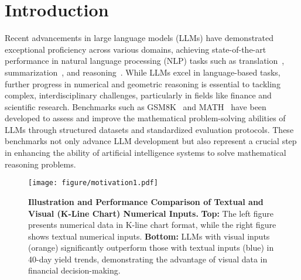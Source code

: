 \section{Introduction}



Recent advancements in large language models (LLMs) have demonstrated exceptional proficiency across various domains, achieving state-of-the-art performance in natural language processing (NLP) tasks such as translation~\citep{TransLLaMa}, summarization~\citep{exploregptquery}, and reasoning~\citep{LLM-ARC, reasoning}. While LLMs excel in language-based tasks, further progress in numerical and geometric reasoning is essential to tackling complex, interdisciplinary challenges, particularly in fields like finance and scientific research. Benchmarks such as \textsc{GSM8K}~\citep{cobbe2021gsm8k} and \textsc{MATH}~\citep{MATH} have been developed to assess and improve the mathematical problem-solving abilities of LLMs through structured datasets and standardized evaluation protocols. These benchmarks not only advance LLM development but also represent a crucial step in enhancing the ability of artificial intelligence systems to solve mathematical reasoning problems.
 
\begin{figure}
	\centering
	\texttt{[image: figure/motivation1.pdf]}
	\caption{\textbf{Illustration and Performance Comparison of Textual and Visual (K-Line Chart) Numerical Inputs.} 
	\textbf{Top:} The left figure presents numerical data in K-line chart format, while the right figure shows textual numerical inputs. 
	\textbf{Bottom:} LLMs with visual inputs (orange) significantly outperform those with textual inputs (blue) in 40-day yield trends, demonstrating the advantage of visual data in financial decision-making.}
	\label{motivation}
	\vspace{-3pt}
\end{figure}

